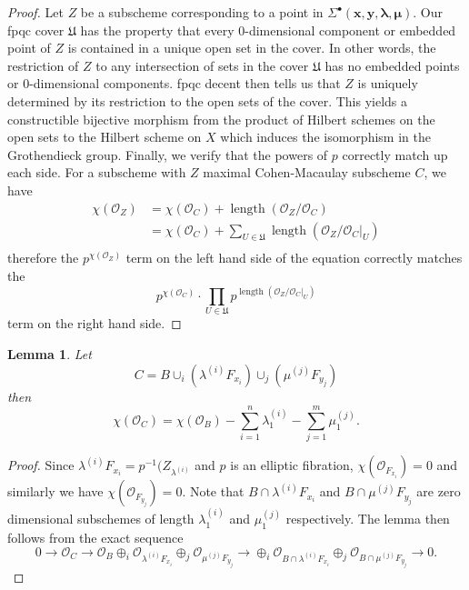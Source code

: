 \documentclass{amsart}
\newtheorem{lemma}[theorem]{Lemma}
\theoremstyle{definition}
\renewcommand{\O}{\mathcal{O}}
\newcommand{\boldx}{\boldsymbol{x}}
\newcommand{\boldy}{\boldsymbol{y}}
\newcommand{\boldlambda}{\boldsymbol{\lambda }}
\newcommand{\boldmu}{\boldsymbol{\mu }}
\newcommand{\Sigmaxylambdamu}{\Sigma^{\bullet }(\boldx ,\boldy ,\boldlambda ,\boldmu )}
\begin{document}
\begin{proof}
Let $Z$ be a subscheme corresponding to a point in
$\Sigmaxylambdamu$. Our fpqc cover $\mathfrak{U}$ has the property
that every 0-dimensional component or embedded point of $Z$ is
contained in a unique open set in the cover. In other words, the
restriction of $Z$ to any intersection of sets in the cover
$\mathfrak{U}$ has no embedded points or 0-dimensional
components. fpqc decent then tells us that $Z$ is uniquely determined
by its restriction to the open sets of the cover. This yields a
constructible bijective morphism from the product of Hilbert schemes
on the open sets to the Hilbert scheme on $X$ which induces the
isomorphism in the Grothendieck group. Finally, we verify that the
powers of $p$ correctly match up each side. For a subscheme with $Z$
maximal Cohen-Macaulay subscheme $C$, we have
\begin{align*}
\chi (\O_{Z})&=\chi (\O_{C}) +\operatorname{length}(\O_{Z}/\O_{C})\\
&=\chi (\O_{C}) +\sum_{U\in \mathfrak{U}}\operatorname{length}(\O_{Z}/\O_{C}|_{U})\\
\end{align*}
therefore the $p^{\chi (\O_{Z})}$ term on the left hand side of the
equation correctly matches the 
\[
p^{\chi (\O_{C})}\cdot \prod_{U\in
\mathfrak{U}}p^{\operatorname{length}(\O_{Z}/\O_{C}|_{U})}
\]
term on
the right hand side.
\end{proof}

\begin{lemma}\label{lem: chi(C)=chi(B) -sum lamba1 - sum mu1}
Let 
\[
C=B\cup_{i}\left(\lambda^{(i)}F_{x_{i}} \right)\cup_{j}\left(\mu^{(j)}F_{y_{j}} \right)
\]
then
\[
\chi (\O_{C}) = \chi (\O_{B}) -\sum_{i=1}^{n}\lambda^{(i)}_{1}
-\sum_{j=1}^{m}\mu^{(j)}_{1}. 
\]
\end{lemma}
\begin{proof}
Since $\lambda^{(i)}F_{x_{i}}=p^{-1}(Z_{\lambda^{(i)}}$ and $p$ is an
elliptic fibration, $\chi (\O_{F_{x_{i}}})=0$ and similarly we have
$\chi (\O_{F_{y_{j}}})=0$. Note that $B\cap \lambda^{(i)}F_{x_{i}}$
and $B\cap \mu^{(j)}F_{y_{j}}$ are zero dimensional subschemes of
length $\lambda^{(i)}_{1}$ and $\mu^{(j)}_{1} $ respectively. The
lemma then follows from the exact sequence
\[
0\to \O_{C} \to
\O_{B}\oplus_{i}\O_{\lambda^{(i)}F_{x_{i}}}\oplus_{j}\O_{\mu^{(j)}F_{y_{j}}}
\to \oplus_{i}\O_{B\cap \lambda^{(i)}F_{x_{i}}}\oplus_{j}\O_{B\cap \mu^{(j)}F_{y_{j}}}  \to 0.
\]
\end{proof}
\end{document}

